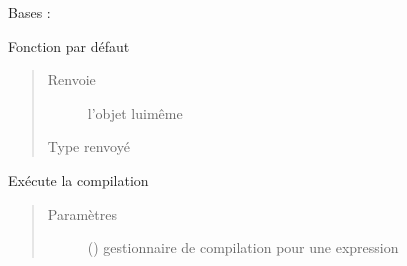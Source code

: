 \documentclass[letterpaper,10pt,french]{sphinxmanual}
\begin{document}
\begin{fulllineitems}
\label{\detokenize{arithmeticexpressionnodes:arithmeticexpressionnodes.ArithmeticExpressionNode}}
Bases : 

\begin{fulllineitems}
\label{\detokenize{arithmeticexpressionnodes:arithmeticexpressionnodes.ArithmeticExpressionNode.clone}}
Fonction par défaut
\begin{quote}\begin{description}
\item[{Renvoie}] \leavevmode
l’objet lui\sphinxhyphen{}même

\item[{Type renvoyé}] \leavevmode
{\hyperref[\detokenize{arithmeticexpressionnodes:arithmeticexpressionnodes.ArithmeticExpressionNode}]{}}

\end{description}\end{quote}

\end{fulllineitems}


\begin{fulllineitems}
\label{\detokenize{arithmeticexpressionnodes:arithmeticexpressionnodes.ArithmeticExpressionNode.compile}}
Exécute la compilation
\begin{quote}\begin{description}
\item[{Paramètres}] \leavevmode
{} ({\hyperref[\detokenize{compileexpressionmanager:compileexpressionmanager.CompileExpressionManager}]{}}) \textendash{} gestionnaire de compilation pour une expression


\end{description}
\end{quote}
\end{fulllineitems}
\end{fulllineitems}
\end{document}
